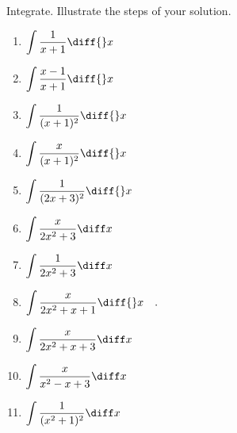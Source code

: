 Integrate. Illustrate the steps of your solution. %
\begin{multicols}{2}
\begin{enumerate}[ref={\fcProblemRef}]
\item $\displaystyle \int \frac{1}{x+1}\diff {}x$

\item $\displaystyle \int \frac{x-1}{x+1}\diff {}x$


\item $\displaystyle \int \frac{ 1}{(x+1)^2}\diff {}x$


\item $\displaystyle \int \frac{x}{(x+1)^2}\diff {}x$


\item $\displaystyle \int \frac{ 1}{ (2x+3)^2}\diff {}x$

\item $\displaystyle
\int \frac{x}{ 2x^2+3}\diff x
$


\item $\displaystyle
\int \frac{1}{ 2x^2+3}\diff x
$


\item \label{problemIntegrate x/(2x^2+x+1) dx}
$\displaystyle\int \frac{x }{2x^2+x+1}\diff{}x\quad .
$



\item $\displaystyle
\int \frac{x}{ 2x^2+x+3}\diff x
$

\item $\displaystyle
\int \frac{x}{ x^2-x+3}\diff x
$

\item $\displaystyle
\int \frac{1}{ (x^2+1)^2}\diff x
$


\end{enumerate}
\end{multicols}
